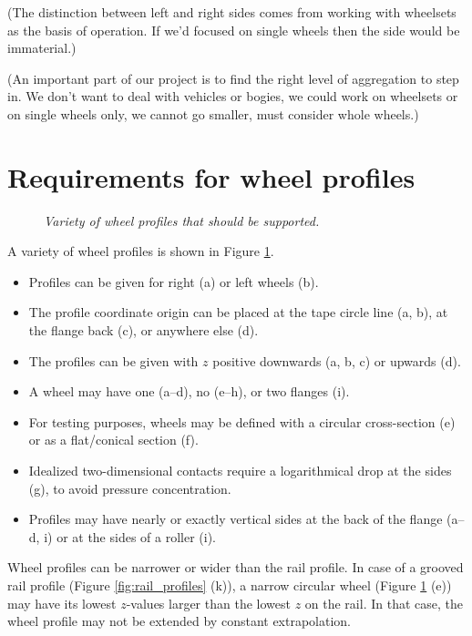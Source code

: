 \documentclass[12pt]{report}
\begin{document}
{(The distinction between left and right sides comes from working with
wheelsets as the basis of operation. If we'd focused on single wheels then
the side would be immaterial.)

(An important part of our project is to find the right level of
aggregation to step in. We don't want to deal with vehicles or bogies, we
could work on wheelsets or on single wheels only, we cannot go smaller,
must consider whole wheels.)

\section{Requirements for wheel profiles}

\begin{figure}[bt]
\centering
{}
\caption{\em Variety of wheel profiles that should be supported.}
\label{fig:wheel_profiles}
\end{figure}

A variety of wheel profiles is shown in Figure \ref{fig:wheel_profiles}.
\begin{itemize}
\item Profiles can be given for right (a) or left wheels (b).
\item The profile coordinate origin can be placed at the tape circle line
        (a, b), at the flange back (c), or anywhere else (d).
\item The profiles can be given with $z$ positive downwards (a, b, c) or
        upwards (d).
\item A wheel may have one (a--d), no (e--h), or two flanges (i).
\item For testing purposes, wheels may be defined with a circular
        cross-section (e) or as a flat/conical section (f).
\item Idealized two-dimensional contacts require a logarithmical drop at
        the sides (g), to avoid pressure concentration.
\item Profiles may have nearly or exactly vertical sides at the back of
        the flange (a--d, i) or at the sides of a roller (i).
\end{itemize}
Wheel profiles can be narrower or wider than the rail profile. In case of a
grooved rail profile (Figure \ref{fig:rail_profiles} (k)), a narrow
circular wheel (Figure \ref{fig:wheel_profiles} (e)) may have its lowest
$z$-values larger than the lowest $z$ on the rail. In that case, the wheel
profile may not be extended by constant extrapolation.

}
\end{document}
